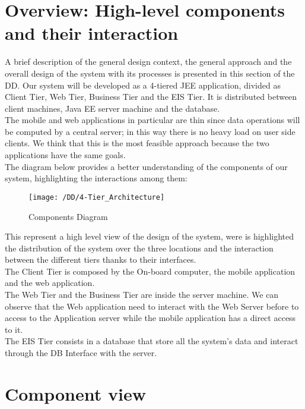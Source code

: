 	\section{Overview: High-level components and their interaction}
A brief description of the general design context, the general approach and the overall design of the system with its processes is presented in this section of the DD.
Our system will be developed as a 4-tiered JEE application, divided as Client Tier, Web Tier, Business Tier and the EIS Tier. It is distributed between client machines, Java EE server machine and the database.
\\The mobile and web applications in particular are thin since data operations will be computed by a central server; in this way there is no heavy load on user side clients. We think that this is the most feasible approach because the two applications have the same goals. 
\\The diagram below provides a better understanding of the components of our system, highlighting the interactions among them:
\begin{figure}[!h]
  \centering
  \vspace{0.2cm}
  \texttt{[image: /DD/4-Tier\_Architecture]}\\
  \vspace{0.4cm}
  \caption{Components Diagram} 
  \label{fig:4-Tier_Architecture} 
\end{figure}

This represent a high level view of the design of the system, were is highlighted the distribution of the system over the three locations and the interaction between the different tiers thanks to their interfaces.
\\The Client Tier is composed by the On-board computer, the mobile application and the web application.
\\The Web Tier and the Business Tier are inside the server machine. We can observe that the Web application need to interact with the Web Server before to access to the Application server while the mobile application has a direct access to it.
\\The EIS Tier consists in a database that store all the system's data and interact through the DB Interface with the server.

 \section{Component view}
